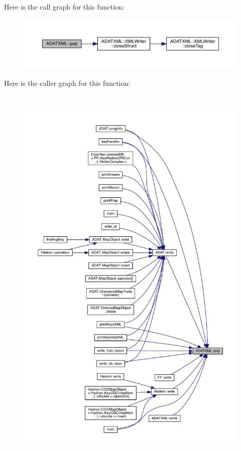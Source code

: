 Here is the call graph for this function\+:\nopagebreak
\begin{figure}[H]
\begin{center}
\leavevmode
\includegraphics[width=350pt]{d2/da3/group__io_gac235f191b977af85918b9a9d063ba5f4_cgraph}
\end{center}
\end{figure}
Here is the caller graph for this function\+:\nopagebreak
\begin{figure}[H]
\begin{center}
\leavevmode
\includegraphics[height=550pt]{d2/da3/group__io_gac235f191b977af85918b9a9d063ba5f4_icgraph}
\end{center}
\end{figure}
\mbox{\label{group__io_gafc9d3fe6a9094c09371a9213eb4b6cdd}} 
